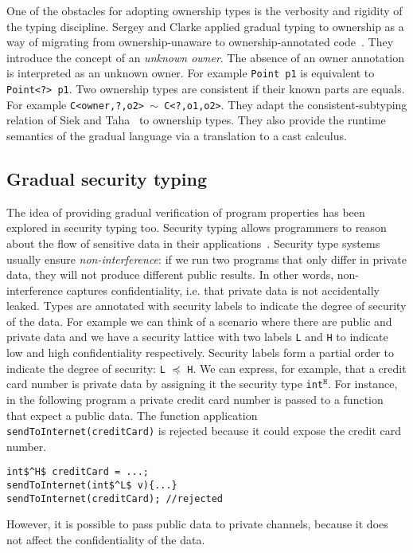 \documentclass{article}
\newcommand\icode[1]{\texttt{#1}}
\begin{document}
One of the obstacles for adopting ownership types is the verbosity and rigidity of the typing discipline. Sergey and Clarke applied gradual typing to ownership as a way of migrating from ownership-unaware to ownership-annotated code~\cite{sergeyClarke:esop2012}. They introduce the concept of an \emph{unknown owner}. The absence of an owner annotation is interpreted as an unknown owner. For example \icode{Point p1} is equivalent to \icode{Point<?> p1}. Two ownership types are consistent if their known parts are equals. For example \icode{C<owner,?,o2> $\sim$ C<?,o1,o2>}. They adapt the consistent-subtyping relation of Siek and Taha~\cite{siekTaha:ecoop2007} to ownership types. They also provide the runtime semantics of the gradual language via a translation to a cast calculus.

\subsection{Gradual security typing}
The idea of providing gradual verification of program properties has been explored in security typing too. Security typing allows programmers to reason about the flow of sensitive data in their applications~\cite{zdancewic}. Security type systems usually ensure \emph{non-interference}: if we run two programs that only differ in private data, they will not produce different public results. In other words, non-interference captures confidentiality, i.e. that private data is not accidentally leaked. Types are annotated with security labels to indicate the degree of security of the data. For example we can think of a scenario where there are public and private data and we have a security lattice with two labels \icode{L} and \icode{H} to indicate low and high confidentiality respectively. Security labels form a partial order to indicate the degree of security: \icode{L} $\preceq$ \icode{H}. We can express, for example, that a credit card number is private data by assigning it the security type \texttt{int}$^\texttt{H}$. For instance, in the following program a private credit card number is passed to a function that expect a public data. The function application \icode{sendToInternet(creditCard)} is rejected because it could expose the credit card number. 
\begin{lstlisting}[language=Lambda]  
int$^H$ creditCard = ...;
sendToInternet(int$^L$ v){...}
sendToInternet(creditCard); //rejected
\end{lstlisting}
However, it is possible to pass public data to private channels, because it does not affect the confidentiality of the data.
\end{document}
